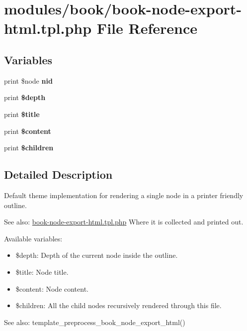 \hypertarget{book-node-export-html_8tpl_8php}{
\section{modules/book/book-node-export-html.tpl.php File Reference}
\label{book-node-export-html_8tpl_8php}
}
\subsection*{Variables}
\begin{CompactItemize}
\item 
\hypertarget{book-node-export-html_8tpl_8php_ff83bc4c67cdf5b085d181488eea273f}{
print \$node \textbf{nid}}
\label{book-node-export-html_8tpl_8php_ff83bc4c67cdf5b085d181488eea273f}

\item 
\hypertarget{book-node-export-html_8tpl_8php_35f688394dd229d173c03c68c439f569}{
print \textbf{\$depth}}
\label{book-node-export-html_8tpl_8php_35f688394dd229d173c03c68c439f569}

\item 
\hypertarget{book-node-export-html_8tpl_8php_ec2795512d255332f57cacd930a090b4}{
print \textbf{\$title}}
\label{book-node-export-html_8tpl_8php_ec2795512d255332f57cacd930a090b4}

\item 
\hypertarget{book-node-export-html_8tpl_8php_b7b7210f43aa78e34f0b202de894a74c}{
print \textbf{\$content}}
\label{book-node-export-html_8tpl_8php_b7b7210f43aa78e34f0b202de894a74c}

\item 
\hypertarget{book-node-export-html_8tpl_8php_82162d46cc50277bcd0aa897f1314edd}{
print \textbf{\$children}}
\label{book-node-export-html_8tpl_8php_82162d46cc50277bcd0aa897f1314edd}

\end{CompactItemize}


\subsection{Detailed Description}
Default theme implementation for rendering a single node in a printer friendly outline.

\begin{Desc}
\item[See also:]\hyperlink{book-node-export-html_8tpl_8php}{book-node-export-html.tpl.php} Where it is collected and printed out.\end{Desc}
Available variables:\begin{itemize}
\item \$depth: Depth of the current node inside the outline.\item \$title: Node title.\item \$content: Node content.\item \$children: All the child nodes recursively rendered through this file.\end{itemize}


\begin{Desc}
\item[See also:]template\_\-preprocess\_\-book\_\-node\_\-export\_\-html() \end{Desc}

